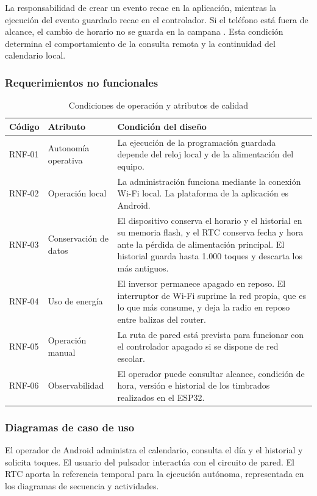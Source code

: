 \documentclass[a4paper,11pt]{article}
\begin{document}
La responsabilidad de crear un evento recae en la aplicación, mientras la ejecución del evento guardado recae en el controlador. Si el teléfono está fuera de alcance, el cambio de horario no se guarda en la campana \cite{ficha}. Esta condición determina el comportamiento de la consulta remota y la continuidad del calendario local.

\clearpage
\subsubsection{Requerimientos no funcionales}
\begin{table}[H]
\centering\small
\caption{Condiciones de operación y atributos de calidad}
\label{tab:rnf}
\begin{tabularx}{\linewidth}{@{}P{1.44cm}P{2.8cm}Y@{}}
\toprule
\textbf{Código} & \textbf{Atributo} & \textbf{Condición del diseño} \\
\midrule
RNF-01 & Autonomía operativa & La ejecución de la programación guardada depende del reloj local y de la alimentación del equipo. \\
RNF-02 & Operación local & La administración funciona mediante la conexión Wi-Fi local. La plataforma de la aplicación es Android. \\
RNF-03 & Conservación de datos & El dispositivo conserva el horario y el historial en su memoria flash, y el RTC conserva fecha y hora ante la pérdida de alimentación principal. El historial guarda hasta 1.000 toques y descarta los más antiguos. \\
RNF-04 & Uso de energía & El inversor permanece apagado en reposo. El interruptor de Wi-Fi suprime la red propia, que es lo que más consume, y deja la radio en reposo entre balizas del router. \\
RNF-05 & Operación manual & La ruta de pared está prevista para funcionar con el controlador apagado si se dispone de red escolar. \\
RNF-06 & Observabilidad & El operador puede consultar alcance, condición de hora, versión e historial de los timbrados realizados en el ESP32. \\
\bottomrule
\end{tabularx}
\end{table}

\subsubsection{Diagramas de caso de uso}
El operador de Android administra el calendario, consulta el día y el historial y solicita toques. El usuario del pulsador interactúa con el circuito de pared. El RTC aporta la referencia temporal para la ejecución autónoma, representada en los diagramas de secuencia y actividades.
\end{document}
